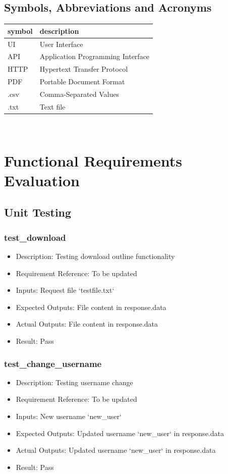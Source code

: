 \documentclass[12pt, titlepage]{article}
\begin{document}
\subsection{Symbols, Abbreviations and Acronyms}

\renewcommand{\arraystretch}{1.2}
\begin{tabular}{l l} 
  \toprule		
  \textbf{symbol} & \textbf{description}\\
  \midrule 
      UI & User Interface \\
      API & Application Programming Interface\\
      HTTP & Hypertext Transfer Protocol\\
      PDF & Portable Document Format\\
      .csv & Comma-Separated Values \\
      .txt & Text file\\
  \bottomrule
  
\end{tabular}\\



\section{Functional Requirements Evaluation}
\subsection{Unit Testing}
\subsubsection{test\_download}\label{3.1.1}
\begin{itemize}
    \item Description: Testing download outline functionality
    \item Requirement Reference: To be updated
    \item Inputs: Request file `testfile.txt` 
    \item Expected Outputs: File content in response.data  
    \item Actual Outputs: File content in response.data  
    \item Result: Pass
\end{itemize}
\subsubsection{test\_change\_username}\label{3.1.2}
\begin{itemize}
    \item Description: Testing username change
    \item Requirement Reference: To be updated
    \item Inputs: New username `new\_user`
    \item Expected Outputs: Updated username `new\_user` in response.data
    \item Actual Outputs: Updated username `new\_user` in response.data
    \item Result: Pass
\end{itemize}
\end{document}
